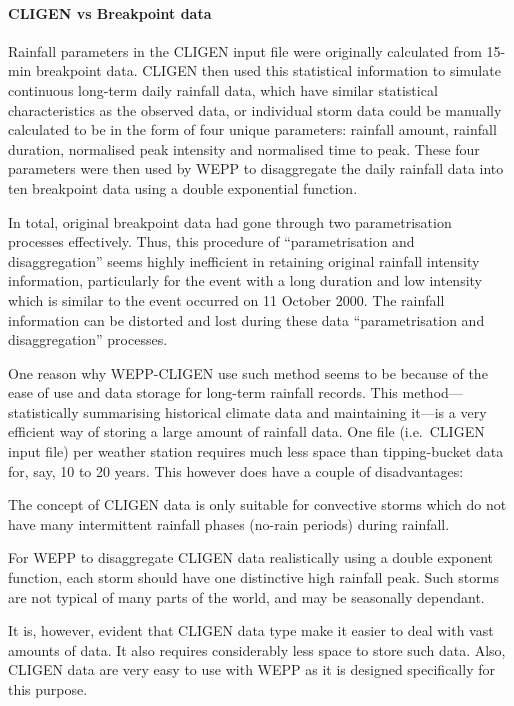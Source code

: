 \paragraph{CLIGEN vs Breakpoint data} Rainfall parameters in the CLIGEN
input file were originally calculated from 15-min breakpoint data. CLIGEN then
used this statistical information to simulate continuous long-term daily
rainfall data, which have similar statistical characteristics as the observed
data, or individual storm data could be manually calculated to be in the form of
four unique parameters: rainfall amount, rainfall duration, normalised peak
intensity and normalised time to peak. These four parameters were then used by
WEPP to disaggregate the daily rainfall data into ten breakpoint data using a
double exponential function.

In total, original breakpoint data had gone through two parametrisation
processes effectively. Thus, this procedure of ``parametrisation and
disaggregation'' seems highly inefficient in retaining original rainfall
intensity information, particularly for the event with a long duration and low
intensity which is similar to the event occurred on 11 October 2000. The
rainfall information can be distorted and lost during these data
``parametrisation and disaggregation'' processes.

One reason why WEPP-CLIGEN use such method seems to be because of the ease of
use and data storage for long-term rainfall records. This method---statistically
summarising historical climate data and maintaining it---is a very efficient way
of storing a large amount of rainfall data. One file (i.e.\ CLIGEN input file)
per weather station requires much less space than tipping-bucket data for, say,
10 to 20 years. This however does have a couple of disadvantages:
\begin{enumerate*}
  \item The concept of CLIGEN data is only suitable for convective storms which
do not have many intermittent rainfall phases (no-rain periods) during rainfall.
\medskip
  \item For WEPP to disaggregate CLIGEN data realistically using a double
exponent function, each storm should have one distinctive high rainfall peak.
Such storms are not typical of many parts of the world, and may be seasonally
dependant.
\end{enumerate*}
It is, however, evident that CLIGEN data type make it easier to deal with vast
amounts of data. It also requires considerably less space to store such data.
Also, CLIGEN data are very easy to use with WEPP as it is designed specifically
for this purpose.

